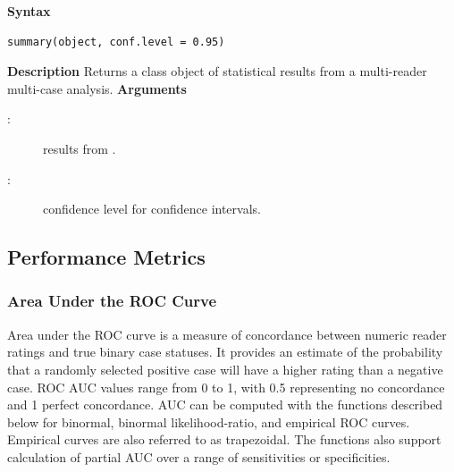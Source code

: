 \documentclass[
]{jss}
\newenvironment{Description}{\textbf{Description}\vspace{0.5em}\newline}{\vspace{0.5em}\newline}
\begin{document}
\begin{tcolorbox}[title=MRMC Summary Function]
\textbf{Syntax}
\begin{verbatim}
summary(object, conf.level = 0.95)
\end{verbatim}
\begin{Description}
Returns a  class object of statistical results from a multi-reader multi-case analysis.
\end{Description}
\textbf{Arguments}
\begin{description}
\item[:] results from .
\item[:] confidence level for confidence intervals.
\end{description}
\end{tcolorbox}

\hypertarget{performance-metrics}{%
\subsection{Performance Metrics}\label{performance-metrics}}

\hypertarget{area-under-the-roc-curve}{%
\subsubsection{Area Under the ROC
Curve}\label{area-under-the-roc-curve}}

Area under the ROC curve is a measure of concordance between numeric
reader ratings and true binary case statuses. It provides an estimate of
the probability that a randomly selected positive case will have a
higher rating than a negative case. ROC AUC values range from 0 to 1,
with 0.5 representing no concordance and 1 perfect concordance. AUC can
be computed with the functions described below for binormal, binormal
likelihood-ratio, and empirical ROC curves. Empirical curves are also
referred to as trapezoidal. The functions also support calculation of
partial AUC over a range of sensitivities or specificities.
\end{document}
